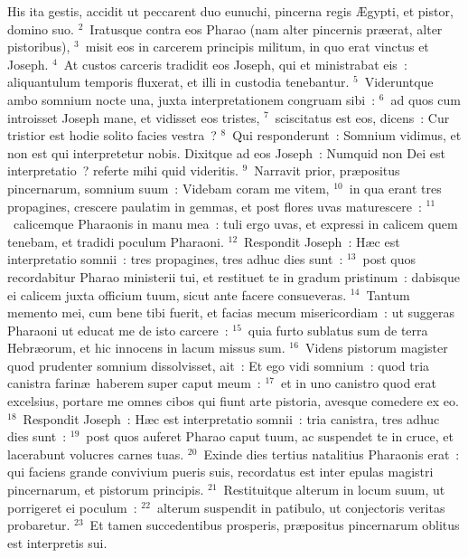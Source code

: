 \lettrine[lines=3,image=true,loversize=0.05,lraise=-0.03]{H}{}is ita gestis, accidit ut peccarent duo eunuchi, pincerna regis \AE gypti, et pistor, domino suo.
${}^{2}$~Iratusque contra eos Pharao (nam alter pincernis pr\ae erat, alter pistoribus),
${}^{3}$~misit eos in carcerem principis militum, in quo erat vinctus et Joseph.
${}^{4}$~At custos carceris tradidit eos Joseph, qui et ministrabat eis~: aliquantulum temporis fluxerat, et illi in custodia tenebantur.
${}^{5}$~Videruntque ambo somnium nocte una, juxta interpretationem congruam sibi~:
${}^{6}$~ad quos cum introisset Joseph mane, et vidisset eos tristes,
${}^{7}$~sciscitatus est eos, dicens~: Cur tristior est hodie solito facies vestra~?
${}^{8}$~Qui responderunt~: Somnium vidimus, et non est qui interpretetur nobis. Dixitque ad eos Joseph~: Numquid non Dei est interpretatio~? referte mihi quid videritis.
${}^{9}$~Narravit prior, pr\ae positus pincernarum, somnium suum~: Videbam coram me vitem,
${}^{10}$~in qua erant tres propagines, crescere paulatim in gemmas, et post flores uvas maturescere~:
${}^{11}$~calicemque Pharaonis in manu mea~: tuli ergo uvas, et expressi in calicem quem tenebam, et tradidi poculum Pharaoni.
${}^{12}$~Respondit Joseph~: H\ae c est interpretatio somnii~: tres propagines, tres adhuc dies sunt~:
${}^{13}$~post quos recordabitur Pharao ministerii tui, et restituet te in gradum pristinum~: dabisque ei calicem juxta officium tuum, sicut ante facere consueveras.
${}^{14}$~Tantum memento mei, cum bene tibi fuerit, et facias mecum misericordiam~: ut suggeras Pharaoni ut educat me de isto carcere~:
${}^{15}$~quia furto sublatus sum de terra Hebr\ae orum, et hic innocens in lacum missus sum.
${}^{16}$~Videns pistorum magister quod prudenter somnium dissolvisset, ait~: Et ego vidi somnium~: quod tria canistra farin\ae\ haberem super caput meum~:
${}^{17}$~et in uno canistro quod erat excelsius, portare me omnes cibos qui fiunt arte pistoria, avesque comedere ex eo.
${}^{18}$~Respondit Joseph~: H\ae c est interpretatio somnii~: tria canistra, tres adhuc dies sunt~:
${}^{19}$~post quos auferet Pharao caput tuum, ac suspendet te in cruce, et lacerabunt volucres carnes tuas.
${}^{20}$~Exinde dies tertius natalitius Pharaonis erat~: qui faciens grande convivium pueris suis, recordatus est inter epulas magistri pincernarum, et pistorum principis.
${}^{21}$~Restituitque alterum in locum suum, ut porrigeret ei poculum~:
${}^{22}$~alterum suspendit in patibulo, ut conjectoris veritas probaretur.
${}^{23}$~Et tamen succedentibus prosperis, pr\ae positus pincernarum oblitus est interpretis sui.


